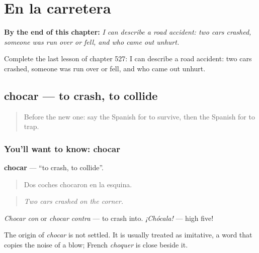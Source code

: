 
\chapter{En la carretera}
\label{ch:es-en-la-carretera}

\begin{chapteropening}
\textbf{By the end of this chapter:} \emph{I can describe a road accident: two cars crashed, someone was run over or fell, and who came out unhurt.}

Complete the last lesson of chapter 527: I can describe a road accident: two cars crashed, someone was run over or fell, and who came out unhurt.
\end{chapteropening}

\section[chocar]{chocar — to crash, to collide}

\label{lesson:ES-C527-chocar}



\begin{quote}
Before the new one: say the Spanish for to survive, then the Spanish for to trap.
\end{quote}

\subsection*{You'll want to know: chocar}
\textbf{chocar} — \textquotedblleft{}to crash, to collide\textquotedblright{}.

\begin{quote}
Dos coches chocaron en la esquina.
\end{quote}

\begin{quote}
\emph{Two cars crashed on the corner.}
\end{quote}

\emph{Chocar con} or \emph{chocar contra} — to crash into. \emph{¡Chócala!} — high five!

\begin{cousinweb}
The origin of \emph{chocar} is not settled. It is usually treated as imitative, a word that copies the noise of a blow; French \emph{choquer} is close beside it.
\end{cousinweb}


